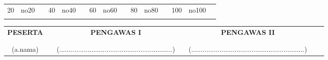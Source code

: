 \documentclass[12pt]{article}
\begin{document}
\begin{table}[]
\begin{tabular}{lllllllllllllll}
\multicolumn{1}{|l|}{20} & 
\multicolumn{1}{l|}{no20}        & 
\multicolumn{1}{l|}{} & 
\multicolumn{1}{l|}{40} & 
\multicolumn{1}{l|}{no40}        & 
\multicolumn{1}{l|}{} & 
\multicolumn{1}{l|}{60} & 
\multicolumn{1}{l|}{no60}        & 
\multicolumn{1}{l|}{} & 
\multicolumn{1}{l|}{80} & 
\multicolumn{1}{l|}{no80}        & 
\multicolumn{1}{l|}{} & 
\multicolumn{1}{l|}{100} & 
\multicolumn{1}{l|}{no100}        &  \\ \cline{1-2} \cline{4-5} \cline{7-8} \cline{10-11} \cline{13-14}
                         &                              &                       &                         &                              &                       &                         &                              &                       &                         &                              &                       &                          &                              &  \\                                              
\end{tabular}
\end{table}
\begin{table}[]
\centering
\vspace{-2cm}
\begin{tabular}{cm{0.5cm}cm{0.5cm}ccc}
\textbf{\small{PESERTA}} & \textbf{} & \textbf{\small{PENGAWAS I}} & \textbf{} & \textbf{\small{PENGAWAS II}} \\ 
 &  &  &  &  \\ 
 &  &  &  &  \\ 
\scriptsize{(a.nama)} &  & \scriptsize{(............................................................) }&  & \scriptsize{(............................................................)} \\ 
\end{tabular}
\end{table}


\end{document}
